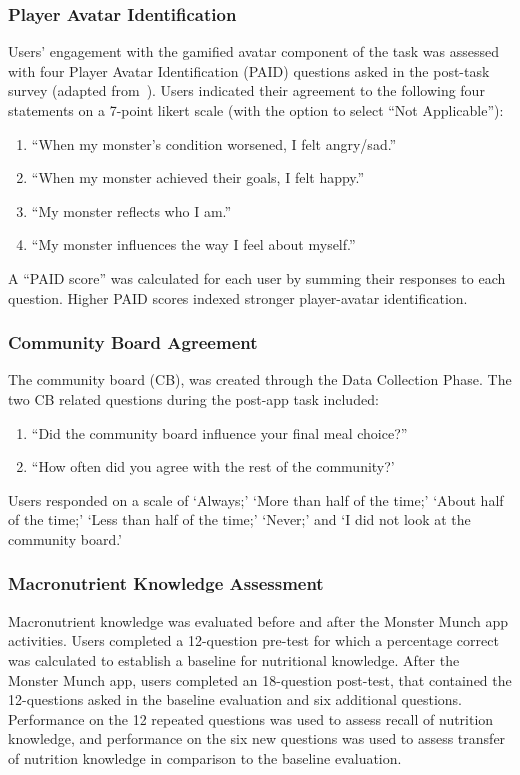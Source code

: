 \subsubsection{Player Avatar Identification}
Users' engagement with the gamified avatar component of the task was assessed with four Player Avatar Identification (PAID) questions asked in the post-task survey (adapted from~\cite{li2013player}). Users indicated their agreement to the following four statements on a 7-point likert scale (with the option to select ``Not Applicable''): 
\begin{enumerate}
    \item ``When my monster’s condition worsened, I felt angry/sad.''
    \item ``When my monster achieved their goals, I felt happy.''
    \item ``My monster reflects who I am.''
    \item ``My monster influences the way I feel about myself.'' 
\end{enumerate}
A ``PAID score'' was calculated for each user by summing their responses to each question. Higher PAID scores indexed stronger player-avatar identification.

\subsubsection{Community Board Agreement}

The community board (CB), was created through the Data Collection Phase. The two CB related questions during the post-app task included: 
\begin{enumerate}
    \item ``Did the community board influence your final meal choice?'' 
    \item ``How often did you agree with the rest of the community?'
\end{enumerate}

Users responded on a scale of `Always;' `More than half of the time;' `About half of the time;' `Less than half of the time;' `Never;' and `I did not look at the community board.' 

\subsubsection{Macronutrient Knowledge Assessment}

Macronutrient knowledge was evaluated before and after the Monster Munch app activities. Users completed a 12-question pre-test for which a percentage correct was calculated to establish a baseline for nutritional knowledge. After the Monster Munch app, users completed an 18-question post-test, that contained the 12-questions asked in the baseline evaluation and six additional questions. Performance on the 12 repeated questions was used to assess recall of nutrition knowledge, and performance on the six new questions was used to assess transfer of nutrition knowledge in comparison to the baseline evaluation. 
\vspace{-5pt}
